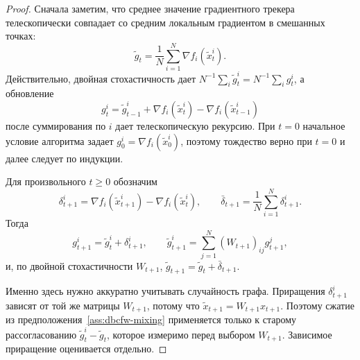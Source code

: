 \begin{proof}
Сначала заметим, что среднее значение градиентного трекера телескопически совпадает со
средним локальным градиентом в смешанных точках:
\begin{equation}
\label{eq:dbcfw-tracker-average}
    \tilde g_t
    =
    \frac1N\sum_{i=1}^N\nabla f_i(\tilde x_t^i).
\end{equation}
Действительно, двойная стохастичность дает
$N^{-1}\sum_i\tilde g_t^i=N^{-1}\sum_i g_t^i$, а обновление
\[
    g_t^i=
    \tilde g_{t-1}^i+
    \nabla f_i(\tilde x_t^i)-\nabla f_i(\tilde x_{t-1}^i)
\]
после суммирования по $i$ дает телескопическую рекурсию.
При $t=0$ начальное условие алгоритма задает
$g_0^i=\nabla f_i(\tilde x_0^i)$, поэтому тождество верно при $t=0$ и далее следует
по индукции.

Для произвольного $t\geq0$ обозначим
\[
    \delta_{t+1}^i
    =
    \nabla f_i(\tilde x_{t+1}^i)-\nabla f_i(\tilde x_t^i),
    \qquad
    \bar\delta_{t+1}
    =
    \frac1N\sum_{i=1}^N\delta_{t+1}^i .
\]
Тогда
\[
    g_{t+1}^i=\tilde g_t^i+\delta_{t+1}^i,
    \qquad
    \tilde g_{t+1}^i=\sum_{j=1}^N(W_{t+1})_{ij}g_{t+1}^j,
\]
и, по двойной стохастичности $W_{t+1}$,
$\tilde g_{t+1}=\tilde g_t+\bar\delta_{t+1}$.

Именно здесь нужно аккуратно учитывать случайность графа.
Приращения $\delta_{t+1}^i$ зависят от той же матрицы $W_{t+1}$, потому что
$\tilde x_{t+1}=W_{t+1}x_{t+1}$.
Поэтому сжатие из предположения~\ref{ass:dbcfw-mixing} применяется только к старому
рассогласованию $\tilde g_t^i-\tilde g_t$, которое измеримо перед выбором $W_{t+1}$.
Зависимое приращение оценивается отдельно.


\end{proof}
